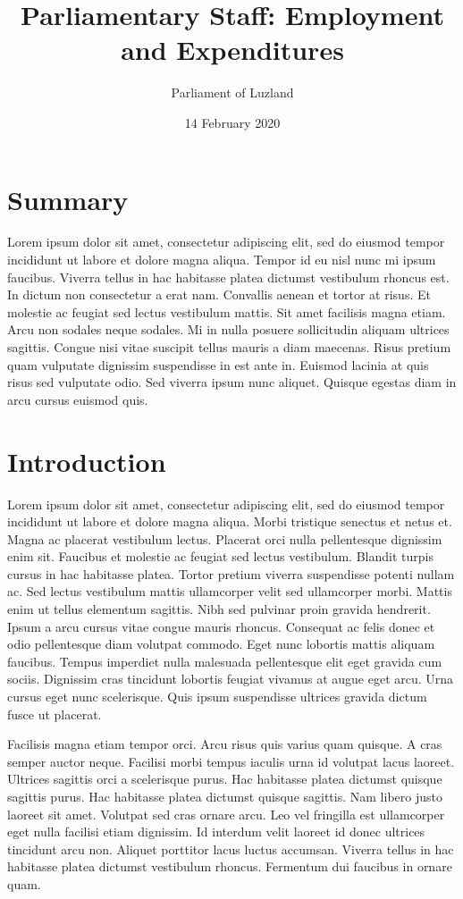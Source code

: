 \documentclass[12pt, oneside, a4paper]{article}
\title{Parliamentary Staff: Employment and Expenditures}
\author{Parliament of Luzland}
\date{14 February 2020}
\begin{document}
\maketitle 

\section*{Summary}
\renewcommand\baselinestretch{1}\selectfont
\noindent Lorem ipsum dolor sit amet, consectetur adipiscing elit, sed do eiusmod tempor incididunt ut labore et dolore magna aliqua. Tempor id eu nisl nunc mi ipsum faucibus. Viverra tellus in hac habitasse platea dictumst vestibulum rhoncus est. In dictum non consectetur a erat nam. Convallis aenean et tortor at risus. Et molestie ac feugiat sed lectus vestibulum mattis. Sit amet facilisis magna etiam. Arcu non sodales neque sodales. Mi in nulla posuere sollicitudin aliquam ultrices sagittis. Congue nisi vitae suscipit tellus mauris a diam maecenas. Risus pretium quam vulputate dignissim suspendisse in est ante in. Euismod lacinia at quis risus sed vulputate odio. Sed viverra ipsum nunc aliquet. Quisque egestas diam in arcu cursus euismod quis. 

\clearpage
\section*{Introduction}
Lorem ipsum dolor sit amet, consectetur adipiscing elit, sed do eiusmod tempor incididunt ut labore et dolore magna aliqua. Morbi tristique senectus et netus et. Magna ac placerat vestibulum lectus. Placerat orci nulla pellentesque dignissim enim sit. Faucibus et molestie ac feugiat sed lectus vestibulum. Blandit turpis cursus in hac habitasse platea. Tortor pretium viverra suspendisse potenti nullam ac. Sed lectus vestibulum mattis ullamcorper velit sed ullamcorper morbi. Mattis enim ut tellus elementum sagittis. Nibh sed pulvinar proin gravida hendrerit. Ipsum a arcu cursus vitae congue mauris rhoncus. Consequat ac felis donec et odio pellentesque diam volutpat commodo. Eget nunc lobortis mattis aliquam faucibus. Tempus imperdiet nulla malesuada pellentesque elit eget gravida cum sociis. Dignissim cras tincidunt lobortis feugiat vivamus at augue eget arcu. Urna cursus eget nunc scelerisque. Quis ipsum suspendisse ultrices gravida dictum fusce ut placerat.

Facilisis magna etiam tempor orci. Arcu risus quis varius quam quisque. A cras semper auctor neque. Facilisi morbi tempus iaculis urna id volutpat lacus laoreet. Ultrices sagittis orci a scelerisque purus. Hac habitasse platea dictumst quisque sagittis purus. Hac habitasse platea dictumst quisque sagittis. Nam libero justo laoreet sit amet. Volutpat sed cras ornare arcu. Leo vel fringilla est ullamcorper eget nulla facilisi etiam dignissim. Id interdum velit laoreet id donec ultrices tincidunt arcu non. Aliquet porttitor lacus luctus accumsan. Viverra tellus in hac habitasse platea dictumst vestibulum rhoncus. Fermentum dui faucibus in ornare quam.
\end{document}
